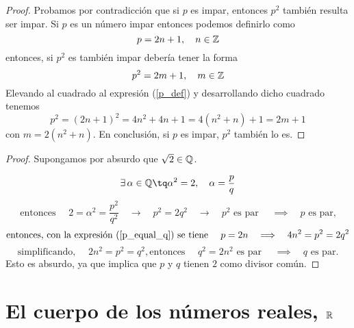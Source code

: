 \begin{proof}
    Probamos por contradicción que si $p$ es impar, entonces $p^2$ también resulta ser impar. Si $p$ es un número impar entonces podemos definirlo como
    \begin{equation}
        \label{p_def}
        p = 2n + 1, \quad n\in\Z
    \end{equation}
    entonces, si $p^2$ es también impar debería tener la forma
    \begin{equation}
        p^2 = 2m + 1, \quad m\in\Z
    \end{equation}
    Elevando al cuadrado al expresión (\ref{p_def}) y desarrollando dicho cuadrado tenemos
    \begin{equation}
        p^2 = \left( 2n + 1 \right)^2 = 4n^2 + 4n + 1 = 4\left( n^2 + n \right) + 1 = 2m + 1
    \end{equation}
    con $m = 2\left( n^2 + n \right) $. En conclusión, si $p$ es impar, $p^2$ también lo es.

\end{proof}

\begin{proof}
    Supongamos por absurdo que $\sqrt{2} \in\Q$.

    \begin{equation}
        \exists\, \alpha\in\Q\tq\alpha^2 = 2, \quad \alpha = \frac{p}{q}
    \end{equation}
    \begin{equation}
        \label{p_equal_q}
        \textrm{entonces } \quad 2 = \alpha^2 = \frac{p^2}{q^2}\quad\rightarrow\quad p^2 = 2q^2 \quad\rightarrow\quad p^2\textrm{ es par }\quad\implies\quad p\textrm{ es par,}
    \end{equation}
    \begin{equation}
        \textrm{entonces, con la expresión (\ref{p_equal_q}) se tiene } \quad p = 2n\quad\implies\quad 4n^2 = p^2 = 2q^2
    \end{equation}
    \begin{equation}
        \textrm{simplificando, }\quad 2n^2 = p^2 = q^2, \textrm{entonces }\quad q^2 = 2n^2\textrm{ es par }\quad\implies\quad q\textrm{ es par.}
    \end{equation}
    Esto es absurdo, ya que implica que $p$ y $q$ tienen $2$ como divisor común.
\end{proof}

\section{El cuerpo de los números reales, $\R$}


